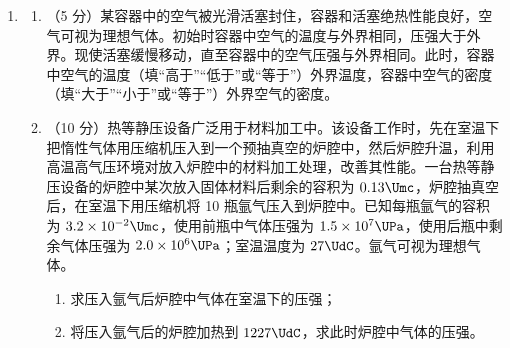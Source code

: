 \documentclass[\gkver]{gaokaozhenti}
\begin{document}
\begin{enumerate}
\item
\begin{enumerate}
	\item
	（5 分）某容器中的空气被光滑活塞封住，容器和活塞绝热性能良好，空气可视为理想气体。初始时容器中空气的温度与外界相同，压强大于外界。现使活塞缓慢移动，直至容器中的空气压强与外界相同。此时，容器中空气的温度（填“高于”“低于”或“等于”）外界温度，容器中空气的密度（填“大于”“小于”或“等于”）外界空气的密度。
	\item
	（10 分）热等静压设备广泛用于材料加工中。该设备工作时，先在室温下把惰性气体用压缩机压入到一个预抽真空的炉腔中，然后炉腔升温，利用高温高气压环境对放入炉腔中的材料加工处理，改善其性能。一台热等静压设备的炉腔中某次放入固体材料后剩余的容积为 $0.13\Umc$，炉腔抽真空后，在室温下用压缩机将 10 瓶氩气压入到炉腔中。已知每瓶氩气的容积为 $3.2\times10^{-2}\Umc$，使用前瓶中气体压强为 $1.5\times10^{7}\UPa$，使用后瓶中剩余气体压强为 $2.0\times10^{6}\UPa$；室温温度为 $27\UdC$。氩气可视为理想气体。
	\begin{enumerate}
		\item
		求压入氩气后炉腔中气体在室温下的压强；
		\item
		将压入氩气后的炉腔加热到 $1227\UdC$，求此时炉腔中气体的压强。
	\end{enumerate}
\end{enumerate}

\end{enumerate}
\end{document}
